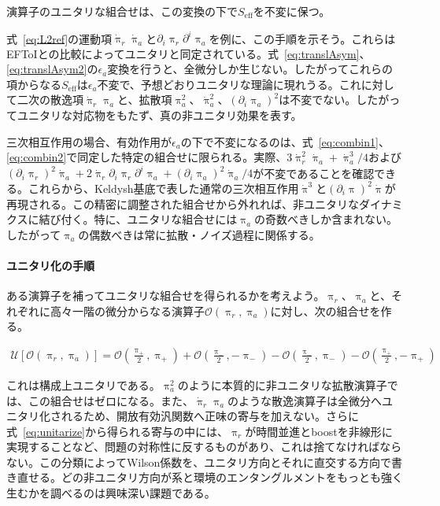 \documentclass[a4paper,11pt]{ltjsarticle}
\numberwithin{equation}{section}
\newcommand{\Eq}[1]{Eq.~(\ref{#1})}
\newcommand{\Eqs}[1]{Eqs.~(\ref{#1})}
\renewcommand{\Eq}[1]{式~\eqref{#1}}
\renewcommand{\Eqs}[1]{式~\eqref{#1}}
\begin{document}
演算子のユニタリな組合せは、この変換の下で$S_{\mathrm{eff}}$を不変に保つ。

\Eq{eq:L2ref}の運動項$\dot{\uppi}_r\dot{\uppi}_a$と$\partial_i\uppi_r\partial^i\uppi_a$を例に、この手順を示そう。これらはEFToIとの比較によってユニタリと同定されている。\Eqs{eq:translAsym}、\eqref{eq:translAsym2}の$\epsilon_a$変換を行うと、全微分しか生じない。したがってこれらの項からなる$S_{\mathrm{eff}}$は$\epsilon_a$不変で、予想どおりユニタリな理論に現れうる。これに対して二次の散逸項$\dot{\uppi}_r\uppi_a$と、拡散項$\uppi_a^2$、$\dot{\uppi}_a^2$、$(\partial_i\uppi_a)^2$は不変でない。したがってユニタリな対応物をもたず、真の非ユニタリ効果を表す。

三次相互作用の場合、有効作用が$\epsilon_a$の下で不変になるのは、\Eqs{eq:combin1}、\eqref{eq:combin2}で同定した特定の組合せに限られる。実際、$3\dot{\uppi}_r^2\dot{\uppi}_a+\dot{\uppi}_a^3/4$および$(\partial_i\uppi_r)^2\dot{\uppi}_a+2\dot{\uppi}_r\partial_i\uppi_r\partial^i\uppi_a+(\partial_i\uppi_a)^2\dot{\uppi}_a/4$が不変であることを確認できる。これらから、Keldysh基底で表した通常の三次相互作用$\dot{\uppi}^3$と$(\partial_i\uppi)^2\dot{\uppi}$が再現される。この精密に調整された組合せから外れれば、非ユニタリなダイナミクスに結び付く。特に、ユニタリな組合せには$\uppi_a$の奇数べきしか含まれない。したがって$\uppi_a$の偶数べきは常に拡散・ノイズ過程に関係する\cite{Hongo:2018ant}。

\paragraph{ユニタリ化の手順}

ある演算子を補ってユニタリな組合せを得られるかを考えよう。$\uppi_r$、$\uppi_a$と、それぞれに高々一階の微分からなる演算子$\mathcal{O}(\uppi_r,\uppi_a)$に対し、次の組合せを作る。

\begin{align}\label{eq:unitarize}
\mathcal{U}\left[\mathcal{O}\left(\uppi_r,\uppi_a\right)\right] = \mathcal{O}\left(\frac{\uppi_+}{2},\uppi_+\right) + \mathcal{O}(\frac{\uppi_-}{2},-\uppi_-) - \mathcal{O}\left(\frac{\uppi_-}{2},\uppi_-\right) - \mathcal{O}(\frac{\uppi_+}{2},-\uppi_+)
\end{align}

これは構成上ユニタリである。$\uppi_a^2$のように本質的に非ユニタリな拡散演算子では、この組合せはゼロになる。また、$\dot{\uppi}_r\uppi_a$のような散逸演算子は全微分へユニタリ化されるため、開放有効汎関数へ正味の寄与を加えない。さらに\Eq{eq:unitarize}から得られる寄与の中には、$\uppi_r$が時間並進とboostを非線形に実現することなど、問題の対称性に反するものがあり、これは捨てなければならない。この分類によってWilson係数を、ユニタリ方向とそれに直交する方向で書き直せる。どの非ユニタリ方向が系と環境のエンタングルメントをもっとも強く生むかを調べるのは興味深い課題である。
\end{document}
